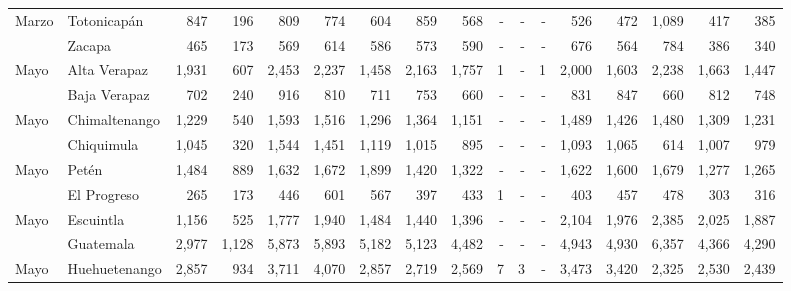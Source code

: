 \begin{landscape}
\begin{center}
\begin{longtable}{llrrrrrrrrrrrrrrr}
\multicolumn{1}{l}{	\footnotesize	 Marzo 	}&	 Totonicapán 	&	 847 	&	 196 	&	 809 	&	 774 	&	 604 	&	 859 	&	 568 	&	 -   	&	 -   	&	 -   	&	 526 	&	 472 	&	 1,089 	&	 417 	&	 385 	\\
\rowcolor{color1!5!white}\multicolumn{1}{l}{	\footnotesize	 Marzo 	}&	 Zacapa 	&	 465 	&	 173 	&	 569 	&	 614 	&	 586 	&	 573 	&	 590 	&	 -   	&	 -   	&	 -   	&	 676 	&	 564 	&	 784 	&	 386 	&	 340 	\\
\multicolumn{1}{l}{	\footnotesize	 Mayo 	}&	 Alta Verapaz 	&	 1,931 	&	 607 	&	 2,453 	&	 2,237 	&	 1,458 	&	 2,163 	&	 1,757 	&	 1 	&	 -   	&	 1 	&	 2,000 	&	 1,603 	&	 2,238 	&	 1,663 	&	 1,447 	\\
\rowcolor{color1!5!white}\multicolumn{1}{l}{	\footnotesize	 Mayo 	}&	 Baja Verapaz 	&	 702 	&	 240 	&	 916 	&	 810 	&	 711 	&	 753 	&	 660 	&	 -   	&	 -   	&	 -   	&	 831 	&	 847 	&	 660 	&	 812 	&	 748 	\\
\multicolumn{1}{l}{	\footnotesize	 Mayo 	}&	 Chimaltenango 	&	 1,229 	&	 540 	&	 1,593 	&	 1,516 	&	 1,296 	&	 1,364 	&	 1,151 	&	 -   	&	 -   	&	 -   	&	 1,489 	&	 1,426 	&	 1,480 	&	 1,309 	&	 1,231 	\\
\rowcolor{color1!5!white}\multicolumn{1}{l}{	\footnotesize	 Mayo 	}&	 Chiquimula 	&	 1,045 	&	 320 	&	 1,544 	&	 1,451 	&	 1,119 	&	 1,015 	&	 895 	&	 -   	&	 -   	&	 -   	&	 1,093 	&	 1,065 	&	 614 	&	 1,007 	&	 979 	\\
\multicolumn{1}{l}{	\footnotesize	 Mayo 	}&	 Petén 	&	 1,484 	&	 889 	&	 1,632 	&	 1,672 	&	 1,899 	&	 1,420 	&	 1,322 	&	 -   	&	 -   	&	 -   	&	 1,622 	&	 1,600 	&	 1,679 	&	 1,277 	&	 1,265 	\\
\rowcolor{color1!5!white}\multicolumn{1}{l}{	\footnotesize	 Mayo 	}&	 El Progreso 	&	 265 	&	 173 	&	 446 	&	 601 	&	 567 	&	 397 	&	 433 	&	 1 	&	 -   	&	 -   	&	 403 	&	 457 	&	 478 	&	 303 	&	 316 	\\
\multicolumn{1}{l}{	\footnotesize	 Mayo 	}&	 Escuintla 	&	 1,156 	&	 525 	&	 1,777 	&	 1,940 	&	 1,484 	&	 1,440 	&	 1,396 	&	 -   	&	 -   	&	 -   	&	 2,104 	&	 1,976 	&	 2,385 	&	 2,025 	&	 1,887 	\\
\rowcolor{color1!5!white}\multicolumn{1}{l}{	\footnotesize	 Mayo 	}&	 Guatemala 	&	 2,977 	&	 1,128 	&	 5,873 	&	 5,893 	&	 5,182 	&	 5,123 	&	 4,482 	&	 -   	&	 -   	&	 -   	&	 4,943 	&	 4,930 	&	 6,357 	&	 4,366 	&	 4,290 	\\
\multicolumn{1}{l}{	\footnotesize	 Mayo 	}&	 Huehuetenango 	&	 2,857 	&	 934 	&	 3,711 	&	 4,070 	&	 2,857 	&	 2,719 	&	 2,569 	&	 7 	&	 3 	&	 -   	&	 3,473 	&	 3,420 	&	 2,325 	&	 2,530 	&	 2,439 	\\

\end{longtable}
\end{center}
\end{landscape}
